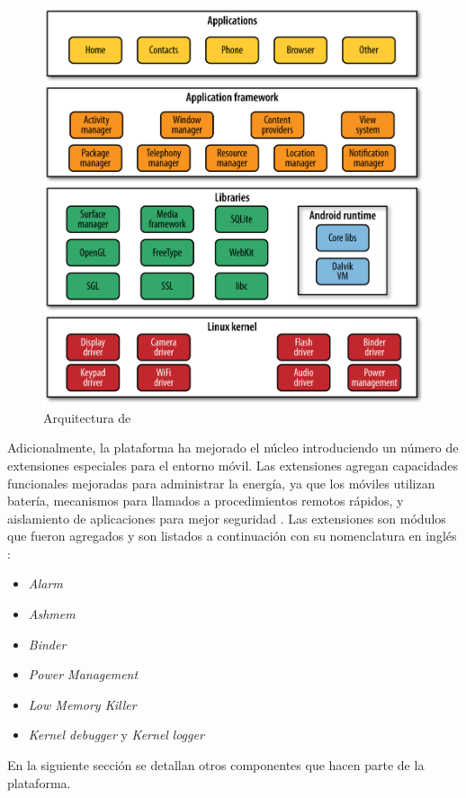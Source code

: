 \begin{figure}[H]
\begin{centering}
\includegraphics[width=0.8\columnwidth]{capitulo-5/graphics/android_stack}
\par\end{centering}
\caption[Arquitectura de Android]{\label{fig5:android-stack}Arquitectura de }
\end{figure}

Adicionalmente, la plataforma ha mejorado el núcleo introduciendo
un número de extensiones especiales para el entorno móvil. Las extensiones
agregan capacidades funcionales mejoradas para administrar la energía,
ya que los móviles utilizan batería, mecanismos para llamados a procedimientos
remotos rápidos, y aislamiento de aplicaciones para mejor seguridad
\cite{Gargenta2014}. Las extensiones son módulos que fueron agregados
y son listados a continuación con su nomenclatura en inglés \cite{Schreiber2011}: 
\begin{itemize}
\item \emph{Alarm }
\item \emph{Ashmem}
\item \emph{Binder}
\item \emph{Power Management}
\item \emph{Low Memory Killer}
\item \emph{Kernel debugger} y \emph{Kernel} \emph{logger}
\end{itemize}
En la siguiente sección se detallan otros componentes que hacen parte
de la plataforma.

